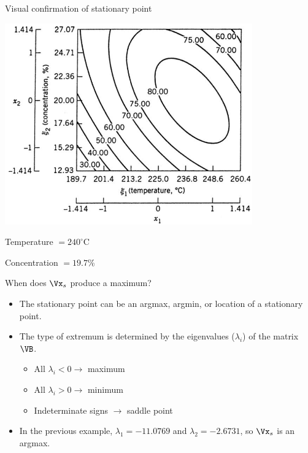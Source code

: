 \documentclass[10pt]{beamer}
\begin{document}
\begin{frame}{Visual confirmation of stationary point}

\includegraphics[width=0.8\textwidth]{figures/rsm_chemical_contour.png}

Temperature $= 240^\circ$C

\medskip
Concentration $= 19.7$\%
	
\end{frame}

\begin{frame}{When does $\Vx_s$ produce a maximum?}

\begin{itemize}
	\item The stationary point can be an argmax, argmin, or location of a stationary point.
	\item<2-> The type of extremum is determined by the eigenvalues ($\lambda_i$) of the matrix $\VB$.
		\begin{itemize}
			\item All $\lambda_i < 0 \rightarrow$ maximum
			\item All $\lambda_i > 0 \rightarrow$ minimum
			\item Indeterminate signs $\rightarrow$ saddle point
		\end{itemize}
	\item<3-> In the previous example, $\lambda_1=-11.0769$ and $\lambda_2=-2.6731$, so $\Vx_s$ is an argmax.
\end{itemize}
	
\end{frame}
\end{document}
